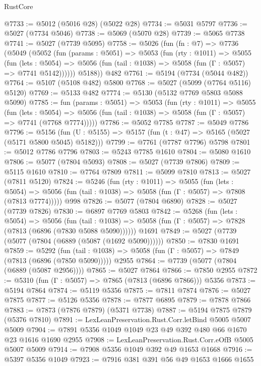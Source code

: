 \begin{lexlean}{RustCore}
\begin{coremodule}
@7733 := @5012 (@5016 @28) (@5022 @28)
@7734 := @5031 @5797
@7736 := @5027 (@7734 @5046)
@7738 := @5069 (@5070 @28)
@7739 := @5065 @7738
@7741 := @5027 (@7739 @5095)
@7758 := @5026
    (fun (fn : @7) =>
    @7736
      (@5049
        (@5052
          (fun (params : @5051) =>
          @5053
            (fun (rty : @1011) =>
            @5055
              (fun (lets : @5054) =>
              @5056 (fun (tail : @1038) => @5058 (fun (Γ : @5057) => @7741 @5142))))))
        @5188))
    @482
@7761 := @5194 (@7734 (@5044 @482))
@7764 := @5107 (@5108 @482) @5800
@7768 := @5027 (@5099 (@7764 @5116) @5120)
@7769 := @5133 @482
@7774 := @5130 (@5132 @7769 @5803 @5088 @5090)
@7785 := fun (params : @5051) =>
  @5053
    (fun (rty : @1011) =>
    @5055
      (fun (lets : @5054) =>
      @5056 (fun (tail : @1038) => @5058 (fun (Γ : @5057) => @7741 (@7768 @7774)))))
@7786 := @5052 @7785
@7787 := @5049 @7786
@7796 := @5156 (fun (U : @5155) => @5157 (fun (t : @47) => @5165 (@5027 (@5171 @5800 @5045) @5182)))
@7799 := @7761 (@7787 @7796) @5798
@7801 := @5012 @7786 @7796
@7803 := @5243 @7785 @1610
@7804 := @5080 @1610
@7806 := @5077 (@7804 @5093)
@7808 := @5027 (@7739 @7806)
@7809 := @5115 @1610
@7810 := @7764 @7809
@7811 := @5099 @7810
@7813 := @5027 (@7811 @5120)
@7824 := @5246
    (fun (rty : @1011) =>
    @5055
      (fun (lets : @5054) =>
      @5056 (fun (tail : @1038) => @5058 (fun (Γ : @5057) => @7808 (@7813 @7774)))))
    @998
@7826 := @5077 (@7804 @6890)
@7828 := @5027 (@7739 @7826)
@7830 := @6897 @7769 @5803
@7842 := @5268
    (fun (lets : @5054) =>
    @5056
      (fun (tail : @1038) => @5058 (fun (Γ : @5057) => @7828 (@7813 (@6896 (@7830 @5088 @5090))))))
    @1691
@7849 := @5027 (@7739 (@5077 (@7804 (@6889 (@5087 (@1692 @5090))))))
@7850 := @7830 @1691
@7859 := @5292
    (fun (tail : @1038) => @5058 (fun (Γ : @5057) => @7849 (@7813 (@6896 (@7850 @5090)))))
    @2955
@7864 := @7739 (@5077 (@7804 (@6889 (@5087 @2956))))
@7865 := @5027 @7864
@7866 := @7850 @2955
@7872 := @5310 (fun (Γ : @5057) => @7865 (@7813 (@6896 @7866))) @5356
@7873 := @5194 @7864
@7874 := @5119 @5356
@7875 := @7811 @7874
@7876 := @5027 @7875
@7877 := @5126 @5356
@7878 := @7877 @6895
@7879 := @7878 @7866
@7883 := @7873 (@7876 @7879) (@5371 @7738)
@7887 := @5194 @7875 @7879 (@5376 @7810)
@7891 := LexLeanPreservation.Rust.Corr.letBind @5005 @5007 @5009
@7904 := @7891 @5356 @1049 @1049 @23 @49 @392 @480 @66 @1670 @23 @1616 @1690 @2955
@7908 := LexLeanPreservation.Rust.Corr.eOfB @5005 @5007 @5009
@7914 := @7908 @5356 @1049 @392 @49 @1653 @1668
@7916 := @5397 @5356 @1049
@7923 := @7916 @381 @391 @56 @49 @1653 @1666 @1655

\end{coremodule}
\end{lexlean}
